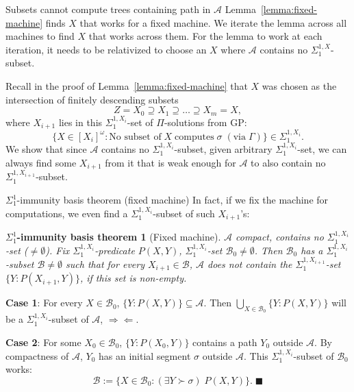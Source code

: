 \begin{frame}{Subsets cannot compute trees containing path in $\mathcal{A}$}
  Lemma~\ref{lemma:fixed-machine} finds $X$ that works for a fixed
  machine. We iterate the lemma across all machines to find $X$ that
  works across them. For the lemma to work at each iteration, it needs
  to be relativized to choose an $X$ where $\mathcal{A}$ contains no
  $\Sigma_1^{1,X}$-subset.

  \vspace{0.5em}
  Recall in the proof of Lemma~\ref{lemma:fixed-machine} that $X$ was
  chosen as the intersection of finitely descending subsets
  \[Z=X_0 \supseteq X_1 \supseteq \ldots\supseteq X_m=X,\]
  where $X_{i+1}$ lies in this $\Sigma_1^{1,X_i}$-set of $\Pi$-solutions
  from GP:
  \[\{X\in[X_i]^\omega: \text{No subset of}\; X\; \text{computes}\;
  \sigma\; (\text{via}\; \Gamma)\} \in\Sigma_1^{1,X_i}.\]
  We show that since $\mathcal{A}$ contains no $\Sigma_1^{1,X_i}$-subset,
  given arbitrary $\Sigma_1^{1,X_i}$-set, we can always find some $X_{i+1}$
  from it that is weak enough for $\mathcal{A}$ to also contain no
  $\Sigma_1^{1,X_{i+1}}$-subset.
\end{frame}

\begin{frame}{$\Sigma_1^1$-immunity basis theorem (fixed machine)}
  In fact, if we fix the machine for computations, we even find a
  $\Sigma_1^{1,X_i}$-subset of such $X_{i+1}$'s:
  \newtheorem*{immunity*}{$\Sigma_1^{1}$-immunity basis theorem}
  \begin{immunity*}[Fixed machine]
    $\mathcal{A}$ compact, contains no $\Sigma_1^{1,X_i}$-set
    ($\neq\emptyset$). Fix $\Sigma_1^{1,X_i}$-predicate $P(X,Y)$,
    $\Sigma_1^{1,X_i}$-set $\mathcal{B}_0\neq\emptyset$. Then
    $\mathcal{B}_0$ has a $\Sigma_1^{1,X_i}$-subset
    $\mathcal{B}\neq\emptyset$ such that for every $X_{i+1}\in\mathcal{B}$,
    $\mathcal{A}$ does not contain the $\Sigma_1^{1,X_{i+1}}$-set
    $\{Y:P(X_{i+1},Y)\}$, if this set is non-empty.
  \end{immunity*}

  \textbf{Case 1}: For every $X\in\mathcal{B}_0$,
  $\{Y:P(X,Y)\}\subseteq\mathcal{A}$. Then $\bigcup_{X\in\mathcal{B}_0}
  \{Y:P(X,Y)\}$ will be a $\Sigma_1^{1,X_i}$-subset of $\mathcal{A}$,
  $\Rightarrow\Leftarrow$.

  \vspace{0.5em}
  \textbf{Case 2}: For some $X_0\in\mathcal{B}_0$, $\{Y:P(X_0,Y)\}$
  contains a path $Y_0$ outside $\mathcal{A}$. By compactness of
  $\mathcal{A}$, $Y_0$ has an initial segment $\sigma$ outside
  $\mathcal{A}$. This $\Sigma_1^{1,X_i}$-subset of $\mathcal{B}_0$ works:
  \[\mathcal{B}:= \{X\in\mathcal{B}_0: (\exists Y\succ\sigma)\; P(X,Y)\}.\;
  \blacksquare\]
\end{frame}

